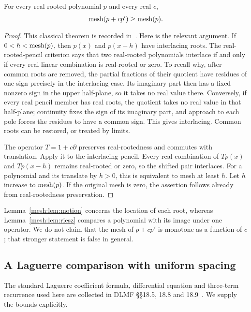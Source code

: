 \begin{lemma}\label{mesh:lem:riesz}
For every real-rooted polynomial $p$ and every real $c$,
\begin{equation}\label{mesh:eq:riesz}
 \operatorname{mesh}(p+c p')\geq\operatorname{mesh}(p).
\end{equation}
\end{lemma}
\begin{proof}
This classical theorem is recorded in~\cite[Theorem~1]{BKS2016}.
Here is the relevant argument. If $0<h<\operatorname{mesh}(p)$, then $p(x)$ and
$p(x-h)$ have interlacing roots. The real-rooted-pencil criterion says
that two real-rooted polynomials interlace if and only if every real
linear combination is real-rooted or zero. To recall why, after common
roots are removed, the partial fractions of their quotient have residues
of one sign precisely in the interlacing case. Its imaginary part then
has a fixed nonzero sign in the upper half-plane, so it takes no real
value there. Conversely, if every real pencil member has real roots,
the quotient takes no real value in that half-plane; continuity fixes
the sign of its imaginary part, and approach to each pole forces the
residues to have a common sign. This gives interlacing. Common roots
can be restored, or treated by limits.

The operator $T=1+c\partial$ preserves real-rootedness and commutes
with translation. Apply it to the interlacing pencil. Every real
combination of $Tp(x)$ and $Tp(x-h)$ remains real-rooted or zero,
so the shifted pair interlaces. For a polynomial and its translate by
$h>0$, this is equivalent to mesh at least $h$. Let $h$ increase to
$\operatorname{mesh}(p)$. If the original mesh is zero, the assertion follows
already from real-rootedness preservation.
\end{proof}

Lemma~\ref{mesh:lem:motion} concerns the location of each root, whereas
Lemma~\ref{mesh:lem:riesz} compares a polynomial with its image under
one operator. We do not claim that the mesh of $p+c p'$ is monotone
as a function of $c$; that stronger statement is false in general.

\subsection{A Laguerre comparison with uniform spacing}

The standard Laguerre coefficient formula, differential equation and
three-term recurrence used here are collected in DLMF
\S\S18.5, 18.8 and 18.9~\cite{DLMF}. We supply the bounds explicitly.

